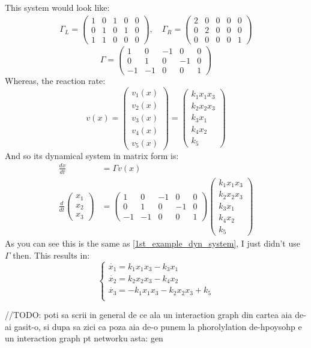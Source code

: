 This system would look like:
\begin{align*}
	\Gamma_L =
	\begin{pmatrix}
		1 & 0 & 1 & 0 & 0 \\
		0 & 1 & 0 & 1 & 0 \\
		1 & 1 & 0 & 0 & 0
	\end{pmatrix}
	, \quad
	\Gamma_R =
	\begin{pmatrix}
		2 & 0 & 0 & 0 & 0 \\
		0 & 2 & 0 & 0 & 0 \\
		0 & 0 & 0 & 0 & 1
	\end{pmatrix}
\end{align*}
\begin{equation*}
 \Gamma =
 \begin{pmatrix*}
		1 & 0 & -1 & 0 & 0 \\
		0 & 1 & 0 & -1 & 0 \\
		-1 & -1 & 0 & 0 & 1
 \end{pmatrix*}
\end{equation*}
Whereas, the reaction rate:
\[
	v(x) =
	\begin{pmatrix*}
		v_{1}(x)	 \\
		v_{2}(x)	 \\
		v_{3}(x)	 \\
		v_{4}(x)	 \\
		v_{5}(x)
	\end{pmatrix*} =
	\begin{pmatrix}
		k_1 x_1 x_3 \\
		k_2 x_2 x_3 \\
		k_3 x_1 \\
		k_4 x_2 \\
		k_5
	\end{pmatrix}
\]
And so its dynamical system in matrix form is:
\begin{align*}
	\frac{dx}{dt} &= \Gamma v(x) \\
	\frac{d}{dt}
	\begin{pmatrix*}
		x_1	\\
		x_2	\\
		x_3	
	\end{pmatrix*} &=
	\begin{pmatrix*}
		1 & 0 & -1 & 0 & 0 \\
		0 & 1 & 0 & -1 & 0 \\
		-1 & -1 & 0 & 0 & 1
 \end{pmatrix*}
	\begin{pmatrix}
		k_1 x_1 x_3 \\
		k_2 x_2 x_3 \\
		k_3 x_1 \\
		k_4 x_2 \\
		k_5
	\end{pmatrix}
\end{align*}
As you can see this is the same as \ref{1st_example_dyn_system}, I just didn't use $\Gamma$ then. This results in:
\[
	\begin{cases*}
		\dot{x_1} = k_1 x_1 x_3 - k_3x_1  \\
		\dot{x_2} = k_2 x_2 x_3 - k_4 x_2  \\
		\dot{x_3} = -k_1 x_1 x_3 - k_2 x_2 x_3 + k_5 \\
	\end{cases*}
\]

\hfill\break
//TODO: poti sa scrii in general de ce ala un interaction graph din cartea aia de-ai gasit-o, si dupa sa zici ca poza aia de-o punem la phorolylation de-hpoysohp e un interaction graph pt networku asta: gen
\hfill\break